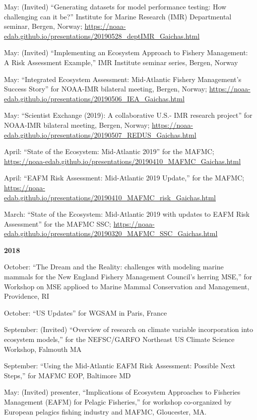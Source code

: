 \documentclass[11pt, a4paper]{awesome-cv}
\begin{document}
May: (Invited) ``Generating datasets for model performance testing: How
challenging can it be?'' Institute for Marine Research (IMR)
Departmental seminar, Bergen, Norway;
\url{https://noaa-edab.github.io/presentations/20190528_deptIMR_Gaichas.html}

May: (Invited) ``Implementing an Ecosystem Approach to Fishery
Management: A Risk Assessment Example,'' IMR Institute seminar series,
Bergen, Norway

May: ``Integrated Ecosystem Assessment: Mid-Atlantic Fishery
Management's Success Story'' for NOAA-IMR bilateral meeting, Bergen,
Norway;
\url{https://noaa-edab.github.io/presentations/20190506_IEA_Gaichas.html}

May: ``Scientist Exchange (2019): A collaborative U.S.- IMR research
project'' for NOAA-IMR bilateral meeting, Bergen, Norway;
\url{https://noaa-edab.github.io/presentations/20190507_REDUS_Gaichas.html}

April: ``State of the Ecosystem: Mid-Atlantic 2019'' for the MAFMC;
\url{https://noaa-edab.github.io/presentations/20190410_MAFMC_Gaichas.html}

April: ``EAFM Risk Assessment: Mid-Atlantic 2019 Update,'' for the
MAFMC;
\url{https://noaa-edab.github.io/presentations/20190410_MAFMC_risk_Gaichas.html}

March: ``State of the Ecosystem: Mid-Atlantic 2019 with updates to EAFM
Risk Assessment'' for the MAFMC SSC;
\url{https://noaa-edab.github.io/presentations/20190320_MAFMC_SSC_Gaichas.html}

\textbf{2018}

October: ``The Dream and the Reality: challenges with modeling marine
mammals for the New England Fishery Management Council's herring MSE,''
for Workshop on MSE applioed to Marine Mammal Conservation and
Management, Providence, RI

October: ``US Updates'' for WGSAM in Paris, France

September: (Invited) ``Overview of research on climate variable
incorporation into ecosystem models,'' for the NEFSC/GARFO Northeast US
Climate Science Workshop, Falmouth MA

September: ``Using the Mid-Atlantic EAFM Risk Assessment: Possible Next
Steps,'' for MAFMC EOP, Baltimore MD

May: (Invited) presenter, ``Implications of Ecosystem Approaches to
Fisheries Management (EAFM) for Pelagic Fisheries,'' for workshop
co-organized by European pelagics fishing industry and MAFMC,
Gloucester, MA.
\end{document}
